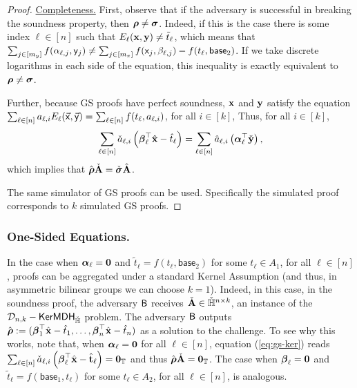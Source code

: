 \begin{proof} {\underline{Completeness.}}
First, observe that if the adversary is successful in breaking the soundness property, then ${\boldsymbol \rho} \neq {\boldsymbol \sigma}$. Indeed, 
if this is the case there is some index $\ell \in [n]$ such that 
$E_{\ell}(\mathbf{x},\mathbf{y}) \neq \tilde{t}_{\ell}$, which means that 
$\sum_{j\in[m_y]} f(\alpha_{\ell,j}, \mathsf{y}_j) \neq 
\sum_{j\in[m_x]}  f(\mathsf{x}_j, \beta_{\ell,j}) - f(t_{\ell},\mathsf{base}_{2})$.  
If we take discrete logarithms in each side of the equation, this inequality is exactly equivalent to
${\boldsymbol \rho} \neq {\boldsymbol \sigma}$.


Further, because GS proofs have perfect soundness, $\mathbf{x}$ and $\mathbf{y}$ satisfy 
the equation $\sum_{\ell\in[n]} a_{\ell,i} E_{\ell}(\vec{\mathsf{x}},\vec{\mathsf{y}})= \sum_{\ell \in [n]} f(t_{\ell}, a_{\ell,i})$, for all $i \in [k]$,
Thus, for all $i\in[k]$, 
\begin{equation}
\sum_{\ell\in[n]} \check{a}_{\ell,i} \left({\boldsymbol \beta}_\ell^\top{\hat{\mathbf{x}}} - \hat{t}_{\ell} \right)  = \sum_{\ell \in [n]} \hat{a}_{\ell,i}
\left({\boldsymbol \alpha}^\top_\ell\check{\mathbf{y}}\right),
\label{eq:gs-ker}
\end{equation}
which implies that $\hat{{\boldsymbol \rho}}\check{\mathbf{{A}}}=\check{{\boldsymbol \sigma}}{\hat{\mathbf{{A}}}}$.

  The same simulator of GS proofs can be used. Specifically
the simulated proof corresponds to $k$ simulated GS proofs.
\end{proof}

\subsubsection{One-Sided Equations.} In the case when ${\boldsymbol \alpha}_{\ell}=\mathbf{{0}}$ and $\tilde{t}_{\ell}=f(t_{\ell},\mathsf{base}_{2})$ for some $t_{\ell} \in A_1$, for all $\ell\in[n]$, proofs can be aggregated under a standard Kernel Assumption (and thus, in asymmetric bilinear groups we can choose $k=1$). Indeed, 
in this case, in the soundness proof, the adversary $\mathsf{B}$ receives $\check{\mathbf{{A}}}\in{\ensuremath{\check{\mathbb{H}}}}^{n\times k}$, an instance of the $\mathcal{D}_{n,k}-\mathsf{KerMDH}_{\check{\mathbb{H}}}$ problem. The adversary $\mathsf{B}$ outputs $\hat{{\boldsymbol \rho}}:=({\boldsymbol \beta}_1^\top{\hat{\mathbf{x}}} -\hat{t}_{1},\ldots,
{\boldsymbol \beta}_{n}^\top{\hat{\mathbf{x}}} -\hat{t}_{n}) $ as a solution to the challenge. To see why this works, note that, when ${\boldsymbol \alpha}_{\ell}=\mathbf{{0}}$ for all $\ell\in[n]$, equation (\ref{eq:gs-ker}) reads $\sum_{\ell\in[n]} \check{a}_{\ell,i} \left({\boldsymbol \beta}_\ell^\top {\hat{\mathbf{x}}} - {\hat{\mathbf{t}}}_{\ell} \right)  = \mathbf{{0}}_{\mathbb{T}}$ and thus $\hat{{\boldsymbol \rho}}\check{\mathbf{{A}}}=\mathbf{{0}}_{\mathbb{T}}$.  The case when ${\boldsymbol \beta}_\ell=\mathbf{{0}}$ and $\tilde{t}_{\ell}=f(\mathsf{base}_{1},t_{\ell})$ for some $t_{\ell} \in A_2$, for all $\ell\in[n]$, is analogous. 

